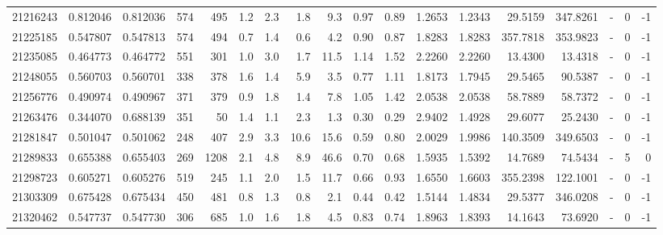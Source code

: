 \begin{tabular}{rrrrrrrrrrrrrrrlrr}
  21216243 & 0.812046 &   0.812036 &  574 &  495 &      1.2 &      2.3 &     1.8 &      9.3 &       0.97 &        0.89 &  1.2653 &  1.2343 &   29.5159 &  347.8261 &             - &        0 &         -1 \\
  21225185 & 0.547807 &   0.547813 &  574 &  494 &      0.7 &      1.4 &     0.6 &      4.2 &       0.90 &        0.87 &  1.8283 &  1.8283 &  357.7818 &  353.9823 &             - &        0 &         -1 \\
  21235085 & 0.464773 &   0.464772 &  551 &  301 &      1.0 &      3.0 &     1.7 &     11.5 &       1.14 &        1.52 &  2.2260 &  2.2260 &   13.4300 &   13.4318 &             - &        0 &         -1 \\
  21248055 & 0.560703 &   0.560701 &  338 &  378 &      1.6 &      1.4 &     5.9 &      3.5 &       0.77 &        1.11 &  1.8173 &  1.7945 &   29.5465 &   90.5387 &             - &        0 &         -1 \\
  21256776 & 0.490974 &   0.490967 &  371 &  379 &      0.9 &      1.8 &     1.4 &      7.8 &       1.05 &        1.42 &  2.0538 &  2.0538 &   58.7889 &   58.7372 &             - &        0 &         -1 \\
  21263476 & 0.344070 &   0.688139 &  351 &   50 &      1.4 &      1.1 &     2.3 &      1.3 &       0.30 &        0.29 &  2.9402 &  1.4928 &   29.6077 &   25.2430 &             - &        0 &         -1 \\
  21281847 & 0.501047 &   0.501062 &  248 &  407 &      2.9 &      3.3 &    10.6 &     15.6 &       0.59 &        0.80 &  2.0029 &  1.9986 &  140.3509 &  349.6503 &             - &        0 &         -1 \\
  21289833 & 0.655388 &   0.655403 &  269 & 1208 &      2.1 &      4.8 &     8.9 &     46.6 &       0.70 &        0.68 &  1.5935 &  1.5392 &   14.7689 &   74.5434 &             - &        5 &          0 \\
  21298723 & 0.605271 &   0.605276 &  519 &  245 &      1.1 &      2.0 &     1.5 &     11.7 &       0.66 &        0.93 &  1.6550 &  1.6603 &  355.2398 &  122.1001 &             - &        0 &         -1 \\
  21303309 & 0.675428 &   0.675434 &  450 &  481 &      0.8 &      1.3 &     0.8 &      2.1 &       0.44 &        0.42 &  1.5144 &  1.4834 &   29.5377 &  346.0208 &             - &        0 &         -1 \\
  21320462 & 0.547737 &   0.547730 &  306 &  685 &      1.0 &      1.6 &     1.8 &      4.5 &       0.83 &        0.74 &  1.8963 &  1.8393 &   14.1643 &   73.6920 &             - &        0 &         -1 \\

\end{tabular}
